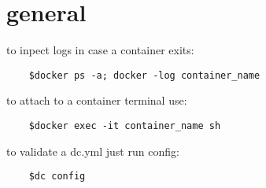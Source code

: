 \section{general}%
\label{sec:general}

to inpect logs in case a container exits:
\begin{verbatim}
	$docker ps -a; docker -log container_name
\end{verbatim}

to attach to a container terminal use:
\begin{verbatim}
	$docker exec -it container_name sh
\end{verbatim}

to validate a dc.yml just run config:
\begin{verbatim}
	$dc config
\end{verbatim}
